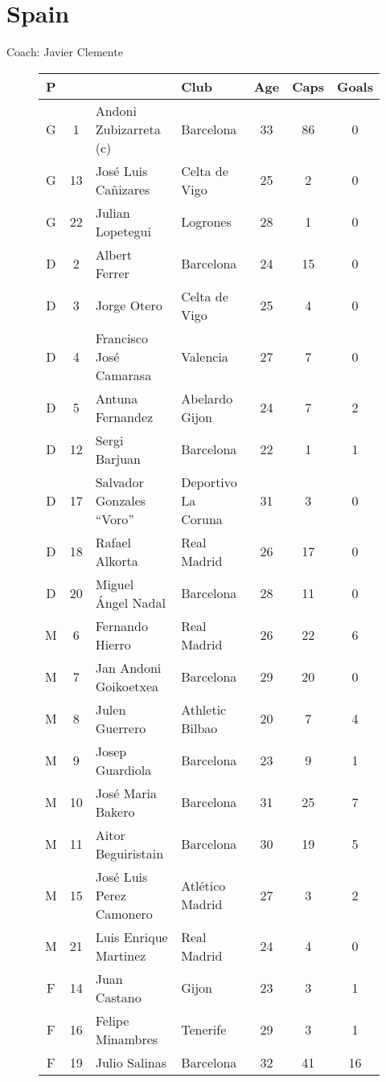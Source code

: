 \chapter{Spain}
\newline
\newline
Coach: Javier Clemente
\begin{figure}[H]
\begin{tabular}{c c l l c c c}
P & & & Club & Age & Caps & Goals \\ \hline
G & 1 & Andoni Zubizarreta (c) & Barcelona &  33 & 86 & 0 \\
G & 13 & Jos{\'e} Luis Ca{\~n}izares & Celta de Vigo & 25 & 2 & 0 \\
G & 22 & Julian Lopetegui & Logrones & 28 & 1 & 0 \\ \hline
D & 2 & Albert Ferrer & Barcelona & 24 & 15 & 0 \\
D & 3 & Jorge Otero & Celta de Vigo & 25 & 4 & 0 \\
D & 4 & Francisco Jos{\'e} Camarasa & Valencia & 27 & 7 & 0 \\
D & 5 & Antuna Fernandez & Abelardo Gijon & 24 & 7 & 2 \\
D & 12 & Sergi Barjuan & Barcelona & 22 & 1 & 1 \\
D & 17 & Salvador Gonzales ``Voro'' & Deportivo La Coruna & 31 & 3 & 0 \\
D & 18 & Rafael Alkorta & Real Madrid & 26 & 17 & 0 \\
D & 20 & Miguel {\'A}ngel Nadal & Barcelona & 28 & 11 & 0 \\ \hline
M & 6 & Fernando Hierro & Real Madrid & 26 & 22 & 6 \\
M & 7 & Jan Andoni Goikoetxea & Barcelona & 29 & 20 & 0 \\
M & 8 & Julen Guerrero & Athletic Bilbao & 20 & 7 & 4 \\
M & 9 & Josep Guardiola & Barcelona & 23 & 9 & 1 \\
M & 10 & Jos{\'e} Maria Bakero & Barcelona & 31 & 25 & 7 \\
M & 11 & Aitor Beguiristain & Barcelona & 30 & 19 & 5 \\
M & 15 & Jos{\'e} Luis Perez Camonero & Atl{\'e}tico Madrid & 27 & 3 & 2 \\
M & 21 & Luis Enrique Martinez & Real Madrid & 24 & 4 & 0 \\ \hline
F & 14 & Juan Castano & Gijon & 23 & 3 & 1 \\
F & 16 & Felipe Minambres & Tenerife & 29 & 3 & 1 \\
F & 19 & Julio Salinas & Barcelona & 32 & 41 & 16 \\ \hline
\end{tabular}
\end{figure}

